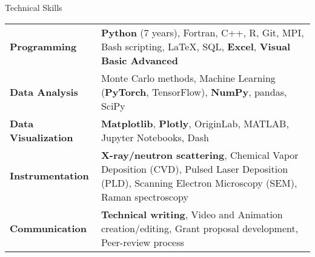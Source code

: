 
\begin{rubric}{Technical Skills}
    \begin{tabular}{@{}p{4.5cm} p{10.5cm}@{}}
        \textbf{Programming} & \textbf{Python} (7 years), Fortran, C++, R, Git, MPI, Bash scripting, LaTeX, SQL, \textbf{Excel},\textbf{ Visual Basic Advanced} \\
        \textbf{Data Analysis} & Monte Carlo methods, Machine Learning (\textbf{PyTorch}, TensorFlow), \textbf{NumPy}, pandas, SciPy \\
        \textbf{Data Visualization} & \textbf{Matplotlib}, \textbf{Plotly}, OriginLab, MATLAB, Jupyter Notebooks, Dash \\
        \textbf{Instrumentation} & \textbf{X-ray/neutron scattering}, Chemical Vapor Deposition (CVD), Pulsed Laser Deposition (PLD), Scanning Electron Microscopy (SEM), Raman spectroscopy \\
        \textbf{Communication} & \textbf{Technical writing}, Video and Animation creation/editing, Grant proposal development, Peer-review process 
    \end{tabular}
\end{rubric}